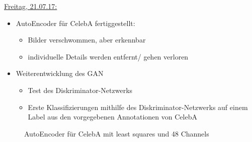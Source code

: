 \documentclass[10pt,a4paper]{report}
\begin{document}
\bigskip	
\uline{Freitag, 21.07.17:}
\begin{itemize}
\item AutoEncoder für CelebA fertiggestellt:
\begin{itemize}
\item Bilder verschwommen, aber erkennbar
\item individuelle Details werden entfernt/ gehen verloren
\end{itemize}
\item Weiterentwicklung des GAN
\begin{itemize}
\item Test des Diskriminator-Netzwerks
\item Erste Klassifizierungen mithilfe des Diskriminator-Netzwerks auf einem Label aus den vorgegebenen Annotationen von CelebA
\end{itemize}
\end{itemize}

\begin{figure}[H]
\centering
{} 
\hspace{0.5cm}
\hspace{0.5cm}
\hspace{0.5cm}
\hspace{0.5cm}
\hspace{0.5cm}
\caption{AutoEncoder für CelebA mit least squares und 48 Channels}
\end{figure}
\end{document}

